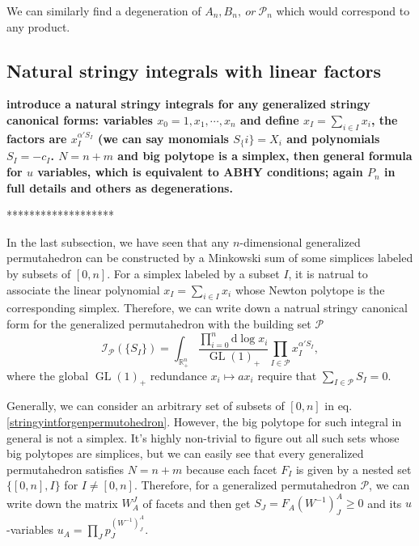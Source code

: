 \documentclass[hidelinks,12pt]{article}
\begin{document}
We can similarly find a degeneration of $A_n,B_n,~or~ {\mathscr P_n}$ which would correspond to any product.


\subsection{Natural stringy integrals with linear factors} 

{\bf introduce a natural stringy integrals for any generalized stringy canonical forms: variables $x_0=1, x_1, \cdots, x_n$ and define $x_I=\sum_{i \in I} x_i$, the factors are $x_I^{\alpha' S_I}$ (we can say monomials $S_\{i\}=X_i$ and polynomials $S_I=-c_I$. $N=n+m$ and big polytope is a simplex, then general formula for $u$ variables, which is equivalent to ABHY conditions; again $P_n$ in full details and others as degenerations.}

*******************

In the last subsection, we have seen that any $n$-dimensional generalized 
permutahedron can be constructed by a Minkowski sum of some simplices labeled by
subsets of $[0,n]$. For a simplex labeled by a subset $I$, 
it is natrual to associate the linear polynomial $x_I=\sum_{i\in I}x_i$ whose Newton polytope is the corresponding simplex. Therefore, we can write down a natrual stringy canonical form for the generalized permutahedron with the building set 
$\mathscr P$
\begin{equation} \label{stringyintforgenpermutohedron}
   \mathcal I_{\mathscr P}(\{S_I\})=\int_{\mathbb R^{n}_+}
	\frac{\prod_{i=0}^n \mathrm{d}\log x_i}
	{\operatorname{GL}(1)_+}\prod_{I\in\mathscr P}x_I^{\alpha' S_I},
\end{equation}
where the global $\operatorname{GL}(1)_+$ redundance $x_i\mapsto a x_i$ require that 
$\sum_{I\in\mathscr P}S_I = 0$. 

Generally, we can consider an arbitrary set of subsets of $[0,n]$ in eq.\eqref{stringyintforgenpermutohedron}. 
However, the big polytope for such integral in general is not a simplex.
It's highly non-trivial to figure out all such sets whose big polytopes are simplices,
but we can easily see that every generalized permutahedron satisfies $N=n+m$
because each facet $F_I$ is given by a nested set $\{[0,n],I\}$ for $I\neq [0,n]$.
Therefore, for a generalized permutahedron $\mathscr P$, we can write down the matrix 
$W^J_A$ of facets and then get $S_J=F_A(W^{-1})^A_J\geq 0$ and 
its $u$-variables $u_A=\prod_J p_J^{(W^{-1})^A_J}$.
\end{document}
